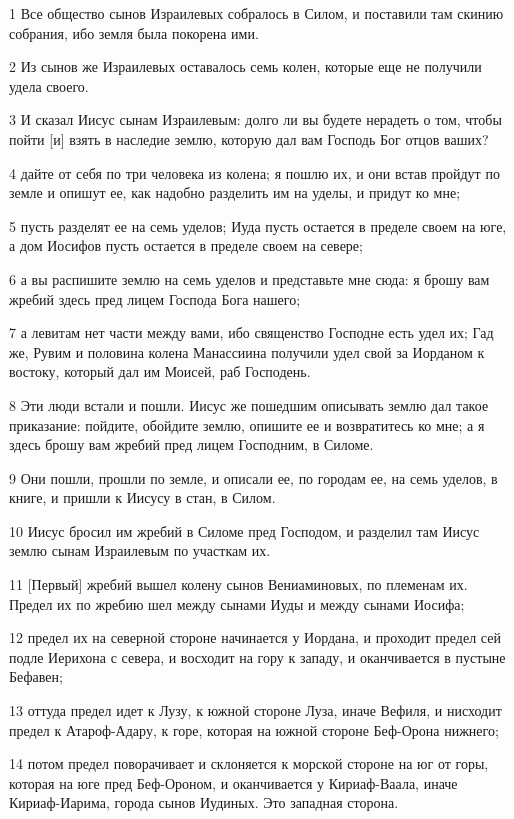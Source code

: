 \par 1 Все общество сынов Израилевых собралось в Силом, и поставили там скинию собрания, ибо земля была покорена ими.
\par 2 Из сынов же Израилевых оставалось семь колен, которые еще не получили удела своего.
\par 3 И сказал Иисус сынам Израилевым: долго ли вы будете нерадеть о том, чтобы пойти [и] взять в наследие землю, которую дал вам Господь Бог отцов ваших?
\par 4 дайте от себя по три человека из колена; я пошлю их, и они встав пройдут по земле и опишут ее, как надобно разделить им на уделы, и придут ко мне;
\par 5 пусть разделят ее на семь уделов; Иуда пусть остается в пределе своем на юге, а дом Иосифов пусть остается в пределе своем на севере;
\par 6 а вы распишите землю на семь уделов и представьте мне сюда: я брошу вам жребий здесь пред лицем Господа Бога нашего;
\par 7 а левитам нет части между вами, ибо священство Господне есть удел их; Гад же, Рувим и половина колена Манассиина получили удел свой за Иорданом к востоку, который дал им Моисей, раб Господень.
\par 8 Эти люди встали и пошли. Иисус же пошедшим описывать землю дал такое приказание: пойдите, обойдите землю, опишите ее и возвратитесь ко мне; а я здесь брошу вам жребий пред лицем Господним, в Силоме.
\par 9 Они пошли, прошли по земле, и описали ее, по городам ее, на семь уделов, в книге, и пришли к Иисусу в стан, в Силом.
\par 10 Иисус бросил им жребий в Силоме пред Господом, и разделил там Иисус землю сынам Израилевым по участкам их.
\par 11 [Первый] жребий вышел колену сынов Вениаминовых, по племенам их. Предел их по жребию шел между сынами Иуды и между сынами Иосифа;
\par 12 предел их на северной стороне начинается у Иордана, и проходит предел сей подле Иерихона с севера, и восходит на гору к западу, и оканчивается в пустыне Бефавен;
\par 13 оттуда предел идет к Лузу, к южной стороне Луза, иначе Вефиля, и нисходит предел к Атароф-Адару, к горе, которая на южной стороне Беф-Орона нижнего;
\par 14 потом предел поворачивает и склоняется к морской стороне на юг от горы, которая на юге пред Беф-Ороном, и оканчивается у Кириаф-Ваала, иначе Кириаф-Иарима, города сынов Иудиных. Это западная сторона.
